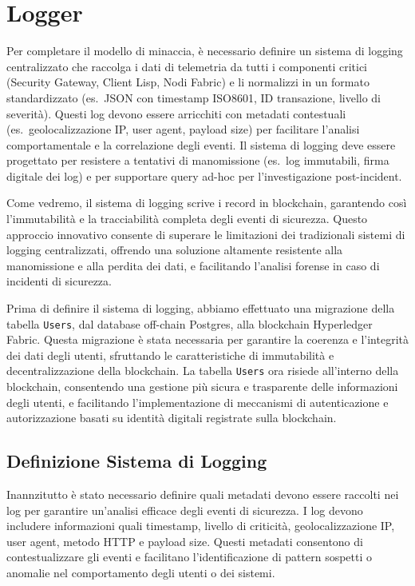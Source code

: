 \newpage

\chapter{Logger}

Per completare il modello di minaccia, è necessario definire un sistema di logging centralizzato che raccolga i dati di telemetria da tutti i componenti critici (Security Gateway, Client Lisp, Nodi Fabric) e li normalizzi in un formato standardizzato (es.\ JSON con timestamp ISO8601, ID transazione, livello di severità).
Questi log devono essere arricchiti con metadati contestuali (es.\ geolocalizzazione IP, user agent, payload size) per facilitare l'analisi comportamentale e la correlazione degli eventi. Il sistema di logging deve essere progettato per resistere a tentativi di manomissione (es.\ log immutabili, firma digitale dei log) e per supportare query ad-hoc per l'investigazione post-incident.

Come vedremo, il sistema di logging scrive i record in blockchain, garantendo così l'immutabilità e la tracciabilità completa degli eventi di sicurezza. Questo approccio innovativo consente di superare le limitazioni dei tradizionali sistemi di logging centralizzati, offrendo una soluzione altamente resistente alla manomissione e alla perdita dei dati, e facilitando l'analisi forense in caso di incidenti di sicurezza.

Prima di definire il sistema di logging, abbiamo effettuato una migrazione della tabella \texttt{Users}, dal database off-chain Postgres, alla blockchain Hyperledger Fabric. Questa migrazione è stata necessaria per garantire la coerenza e l'integrità dei dati degli utenti, sfruttando le caratteristiche di immutabilità e decentralizzazione della blockchain. La tabella \texttt{Users} ora risiede all'interno della blockchain, consentendo una gestione più sicura e trasparente delle informazioni degli utenti, e facilitando l'implementazione di meccanismi di autenticazione e autorizzazione basati su identità digitali registrate sulla blockchain. 

\section{Definizione Sistema di Logging}

Inannzitutto è stato necessario definire quali metadati devono essere raccolti nei log per garantire un'analisi efficace degli eventi di sicurezza. I log devono includere informazioni quali timestamp, livello di criticità, geolocalizzazione IP, user agent, metodo HTTP e payload size. Questi metadati consentono di contestualizzare gli eventi e facilitano l'identificazione di pattern sospetti o anomalie nel comportamento degli utenti o dei sistemi.

